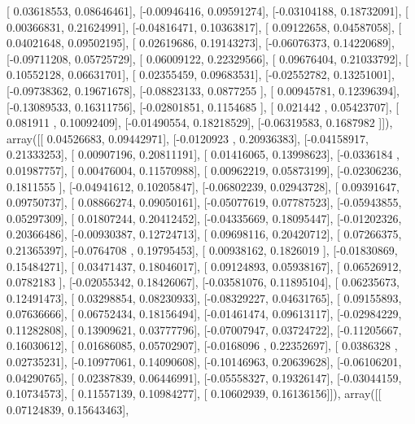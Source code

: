 \documentclass{article}
\begin{document}
       [ 0.03618553,  0.08646461],
       [-0.00946416,  0.09591274],
       [-0.03104188,  0.18732091],
       [ 0.00366831,  0.21624991],
       [-0.04816471,  0.10363817],
       [ 0.09122658,  0.04587058],
       [ 0.04021648,  0.09502195],
       [ 0.02619686,  0.19143273],
       [-0.06076373,  0.14220689],
       [-0.09711208,  0.05725729],
       [ 0.06009122,  0.22329566],
       [ 0.09676404,  0.21033792],
       [ 0.10552128,  0.06631701],
       [ 0.02355459,  0.09683531],
       [-0.02552782,  0.13251001],
       [-0.09738362,  0.19671678],
       [-0.08823133,  0.0877255 ],
       [ 0.00945781,  0.12396394],
       [-0.13089533,  0.16311756],
       [-0.02801851,  0.1154685 ],
       [ 0.021442  ,  0.05423707],
       [ 0.081911  ,  0.10092409],
       [-0.01490554,  0.18218529],
       [-0.06319583,  0.1687982 ]]), array([[ 0.04526683,  0.09442971],
       [-0.0120923 ,  0.20936383],
       [-0.04158917,  0.21333253],
       [ 0.00907196,  0.20811191],
       [ 0.01416065,  0.13998623],
       [-0.0336184 ,  0.01987757],
       [ 0.00476004,  0.11570988],
       [ 0.00962219,  0.05873199],
       [-0.02306236,  0.1811555 ],
       [-0.04941612,  0.10205847],
       [-0.06802239,  0.02943728],
       [ 0.09391647,  0.09750737],
       [ 0.08866274,  0.09050161],
       [-0.05077619,  0.07787523],
       [-0.05943855,  0.05297309],
       [ 0.01807244,  0.20412452],
       [-0.04335669,  0.18095447],
       [-0.01202326,  0.20366486],
       [-0.00930387,  0.12724713],
       [ 0.09698116,  0.20420712],
       [ 0.07266375,  0.21365397],
       [-0.0764708 ,  0.19795453],
       [ 0.00938162,  0.1826019 ],
       [-0.01830869,  0.15484271],
       [ 0.03471437,  0.18046017],
       [ 0.09124893,  0.05938167],
       [ 0.06526912,  0.0782183 ],
       [-0.02055342,  0.18426067],
       [-0.03581076,  0.11895104],
       [ 0.06235673,  0.12491473],
       [ 0.03298854,  0.08230933],
       [-0.08329227,  0.04631765],
       [ 0.09155893,  0.07636666],
       [ 0.06752434,  0.18156494],
       [-0.01461474,  0.09613117],
       [-0.02984229,  0.11282808],
       [ 0.13909621,  0.03777796],
       [-0.07007947,  0.03724722],
       [-0.11205667,  0.16030612],
       [ 0.01686085,  0.05702907],
       [-0.0168096 ,  0.22352697],
       [ 0.0386328 ,  0.02735231],
       [-0.10977061,  0.14090608],
       [-0.10146963,  0.20639628],
       [-0.06106201,  0.04290765],
       [ 0.02387839,  0.06446991],
       [-0.05558327,  0.19326147],
       [-0.03044159,  0.10734573],
       [ 0.11557139,  0.10984277],
       [ 0.10602939,  0.16136156]]), array([[ 0.07124839,  0.15643463],
\end{document}
